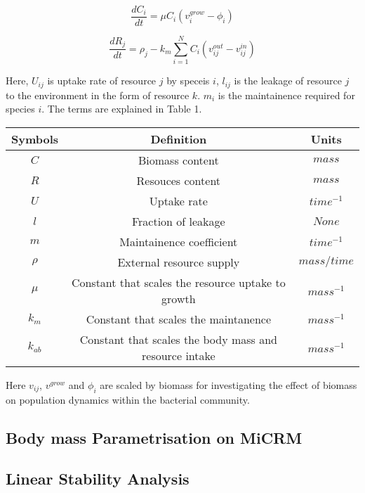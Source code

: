 \documentclass[12pt]{article}
\begin{document}
\begin{equation} 
    \frac{dC_i}{dt} = \mu C_i  ( v^{grow}_i  - \phi_i )
\end{equation}

 \begin{equation}
    \frac{dR_j}{dt} = \rho_j - k_{m} \sum^N_{i=1} C_i (v^{out}_{ij} - v^{in}_{ij})
 \end{equation}

 Here, $U_{ij}$ is uptake rate of resource $j$ by speceis $i$, $l_{ij}$ is the leakage of resource $j$ to the environment in the form of resource $k$. $m_i$ is the maintainence required for species $i$. The terms are explained in Table 1. 

 \begin{center}
    \begin{tabular}{ |c|c|c| } 
     \hline
     Symbols & Definition & Units \\

     \hline 
     $C$ & Biomass content & $mass$ \\ 
     $R$ & Resouces content & $mass$ \\
     $U$ & Uptake rate & $time^{-1}$ \\
     $l$ & Fraction of leakage & $None$ \\
     $m$ & Maintainence coefficient & $time^{-1}$ \\
     $\rho$ & External resource supply & $mass/time$ \\
     $\mu$ &  Constant that scales the resource uptake to growth & $mass^{-1}$ \\
     $k_m$ & Constant that scales the maintanence & $mass^{-1}$ \\
     $k_{ab}$ & Constant that scales the body mass and resource intake & $mass^{-1}$ \\
     \hline

    \end{tabular}
    \end{center}

Here $v_{ij}$, $v^{grow}$ and $\phi_i$ are scaled by biomass for investigating the effect of biomass on population dynamics within the bacterial community. 

\subsection{Body mass Parametrisation on MiCRM}

\subsection{Linear Stability Analysis}
\end{document}
